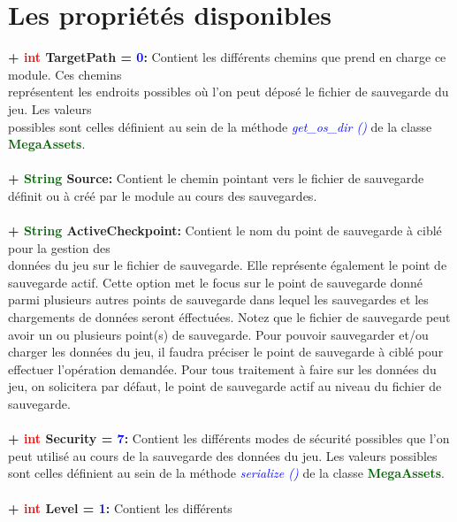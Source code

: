 \documentclass[a4paper, 11pt]{article}
\begin{document}
	\section{Les propriétés disponibles}
	\textbf{+ \textcolor{red}{int} \hypertarget{idx}{TargetPath} = \textcolor{blue}{0}:} Contient les 
	différents chemins que prend en charge ce module. Ces chemins \\représentent les endroits possibles où
	l'on peut déposé le fichier de sauvegarde du jeu. Les valeurs \\possibles sont celles définient au sein
	de la méthode \textit{\textcolor{blue}{get\_os\_dir ()}} de la classe \textbf{\textcolor{darkgreen}
	{MegaAssets}}.\\\\
	\textbf{+ \textcolor{darkgreen}{String} Source:} Contient le chemin pointant vers le fichier de
	sauvegarde définit ou à créé par le module au cours des sauvegardes.\\\\
	\textbf{+ \textcolor{darkgreen}{String} ActiveCheckpoint:} Contient le nom du point de sauvegarde à
	ciblé pour la gestion des \\données du jeu sur le fichier de sauvegarde. Elle représente également le
	point de sauvegarde actif. Cette option met le focus sur le point de sauvegarde donné parmi plusieurs 
	autres points de sauvegarde dans lequel les sauvegardes et les chargements de données seront éffectuées.
	Notez que le fichier de sauvegarde peut avoir un ou plusieurs point(s) de sauvegarde. Pour pouvoir 
	sauvegarder et/ou charger les données du jeu, il faudra préciser le point de sauvegarde à ciblé pour 
	effectuer l'opération demandée. Pour tous traitement à faire sur les données du jeu, on solicitera par 
	défaut, le point de sauvegarde actif au niveau du fichier de sauvegarde.\\\\
	\textbf{+ \textcolor{red}{int} \hypertarget{idx}{Security} = \textcolor{blue}{7}:} Contient les
	différents modes de sécurité possibles que l'on peut utilisé au cours de la sauvegarde des données du
	jeu. Les valeurs possibles sont celles définient au sein de la méthode \textit{\textcolor{blue}
	{serialize ()}} de la classe \textbf{\textcolor{darkgreen}{MegaAssets}}.\\\\
	\textbf{+ \textcolor{red}{int} \hypertarget{idx}{Level} = \textcolor{blue}{1}:} Contient les différents
\end{document}

